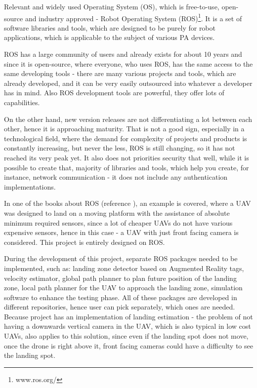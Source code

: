 \documentclass[11pt,a4paper,footinclude=true,headinclude=true, oneside]{scrbook}
\begin{document}
Relevant and widely used Operating System (OS), which is free-to-use, open-source and industry approved - Robot Operating System (ROS)\footnote{www.ros.org/}. It is a set of software libraries and tools, which are designed to be purely for robot applications, which is applicable to the subject of various PA devices.

ROS has a large community of users and already exists for about 10 years and since it is open-source, where everyone, who uses ROS, has the same access to the same developing tools - there are many various projects and tools, which are already developed, and it can be very easily outsourced into whatever a developer has in mind. Also ROS development tools are powerful, they offer lots of capabilities.

On the other hand, new version releases are not differentiating a lot between each other, hence it is approaching maturity. That is not a good sign, especially in a technological field, where the demand for complexity of projects and products is constantly increasing, but never the less, ROS is still changing, so it has not reached its very peak yet. It also does not priorities security that well, while it is possible to create that, majority of libraries and tools, which help you create, for instance, network communication - it does not include any authentication implementations.

In one of the books about ROS (reference \cite{koubaa_robot_2021}), an example is covered, where a UAV was designed to land on a moving platform with the assistance of absolute minimum required sensors, since a lot of cheaper UAVs do not have various expensive sensors, hence in this case - a UAV with just front facing camera is considered. This project is entirely designed on ROS.

During the development of this project, separate ROS packages needed to be implemented, such as: landing zone detector based on Augmented Reality tags, velocity estimator, global path planner to plan future position of the landing zone, local path planner for the UAV to approach the landing zone, simulation software to enhance the testing phase. All of these packages are developed in different repositories, hence user can pick separately, which ones are needed. Because project has an implementation of landing estimation - the problem of not having a downwards vertical camera in the UAV, which is also typical in low cost UAVs, also applies to this solution, since even if the landing spot does not move, once the drone is right above it, front facing cameras could have a difficulty to see the landing spot.
\end{document}
